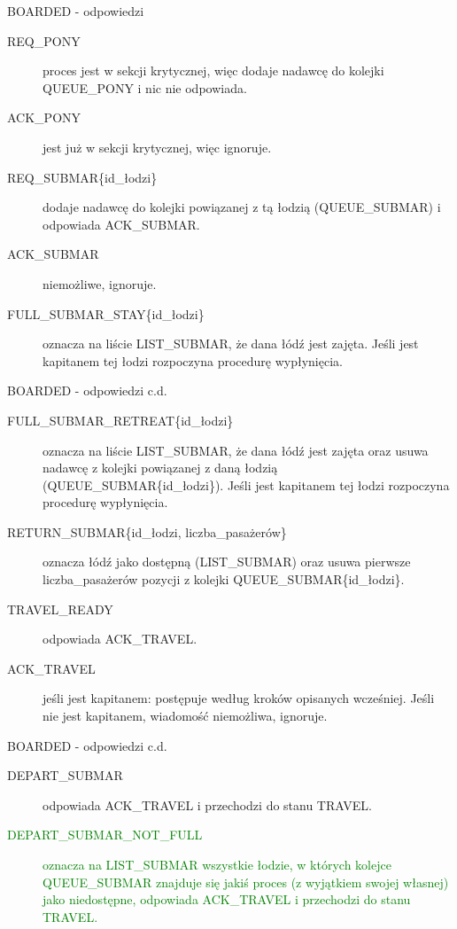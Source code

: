 \documentclass{beamer}
\begin{document}
\begin{frame}{BOARDED - odpowiedzi}
    \internallinenumbers
    \resetlinenumber[1]
    \begin{description}
        \item [REQ\_PONY] proces jest w sekcji krytycznej, więc dodaje nadawcę do kolejki QUEUE\_PONY i nic nie odpowiada. 
        \item [ACK\_PONY] jest już w sekcji krytycznej, więc ignoruje.
        \item [REQ\_SUBMAR\{id\_łodzi\}] dodaje nadawcę do kolejki powiązanej z tą łodzią (QUEUE\_SUBMAR) i odpowiada ACK\_SUBMAR.
        \item [ACK\_SUBMAR] niemożliwe, ignoruje.
        \item [FULL\_SUBMAR\_STAY\{id\_łodzi\}] oznacza na liście LIST\_SUBMAR, że dana łódź jest zajęta. Jeśli jest kapitanem tej łodzi rozpoczyna procedurę wypłynięcia.

    \end{description}
\end{frame}

\begin{frame}{BOARDED - odpowiedzi c.d.}
    \internallinenumbers
    \resetlinenumber[1]
    \begin{description}
        \item [FULL\_SUBMAR\_RETREAT\{id\_łodzi\}] oznacza na liście LIST\_SUBMAR, że dana łódź jest zajęta oraz usuwa nadawcę z kolejki powiązanej z daną łodzią (QUEUE\_SUBMAR\{id\_łodzi\}). Jeśli jest kapitanem tej łodzi rozpoczyna procedurę wypłynięcia.
        \item [RETURN\_SUBMAR\{id\_łodzi, liczba\_pasażerów\}] oznacza łódź jako dostępną (LIST\_SUBMAR) oraz usuwa pierwsze liczba\_pasażerów pozycji z kolejki QUEUE\_SUBMAR\{id\_łodzi\}.
        \item [TRAVEL\_READY] odpowiada ACK\_TRAVEL.
        \item [ACK\_TRAVEL] jeśli jest kapitanem: postępuje według kroków opisanych wcześniej. Jeśli nie jest kapitanem, wiadomość niemożliwa, ignoruje.
    \end{description}
\end{frame}

\begin{frame}{BOARDED - odpowiedzi c.d.}
    \internallinenumbers
    \resetlinenumber[1]
    \begin{description}
        \item [DEPART\_SUBMAR] odpowiada ACK\_TRAVEL i przechodzi do stanu TRAVEL.
        \item [\textcolor{green}{DEPART\_SUBMAR\_NOT\_FULL}] \textcolor{green}{oznacza na LIST\_SUBMAR wszystkie łodzie, w których kolejce QUEUE\_SUBMAR znajduje się jakiś proces (z wyjątkiem swojej własnej) jako niedostępne, odpowiada ACK\_TRAVEL i przechodzi do stanu TRAVEL.}
    \end{description}
\end{frame}
\end{document}

